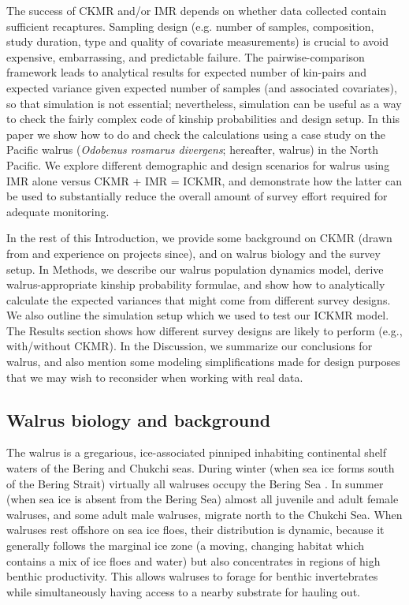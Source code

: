 The success of CKMR and/or IMR depends on whether data collected contain
sufficient recaptures. Sampling design (e.g. number of samples, composition,
study duration, type and quality of covariate measurements) is crucial
to avoid expensive, embarrassing, and predictable failure. The pairwise-comparison
framework leads to analytical results for expected number of kin-pairs
and expected variance given expected number of samples (and associated
covariates), so that simulation is not essential; nevertheless, simulation
can be useful as a way to check the fairly complex code of kinship
probabilities and design setup. In this paper we show how to do and
check the calculations using a case study on the Pacific walrus (\emph{Odobenus
rosmarus divergens}; hereafter, walrus) in the North Pacific. We explore
different demographic and design scenarios for walrus using IMR alone
versus CKMR + IMR = ICKMR, and demonstrate how the latter can be used
to substantially reduce the overall amount of survey effort required
for adequate monitoring.

In the rest of this Introduction, we provide some background on CKMR
(drawn from \citealt{bravington_close-kin_2016} and experience on
projects since), and on walrus biology and the survey setup. In Methods,
we describe our walrus population dynamics model, derive walrus-appropriate
kinship probability formulae, and show how to analytically calculate
the expected variances that might come from different survey designs.
We also outline the simulation setup which we used to test our ICKMR
model. The Results section shows how different survey designs are
likely to perform (e.g., with\slash without CKMR). In the Discussion,
we summarize our conclusions for walrus, and also mention some modeling
simplifications made for design purposes that we may wish to reconsider
when working with real data.

\subsection{Walrus biology and background}

The walrus is a gregarious, ice-associated pinniped inhabiting continental
shelf waters of the Bering and Chukchi seas. During winter (when sea
ice forms south of the Bering Strait) virtually all walruses occupy
the Bering Sea \citep{fay_ecology_1982}. In summer (when sea ice
is absent from the Bering Sea) almost all juvenile and adult female
walruses, and some adult male walruses, migrate north to the Chukchi
Sea. When walruses rest offshore on sea ice floes, their distribution
is dynamic, because it generally follows the marginal ice zone (a
moving, changing habitat which contains a mix of ice floes and water)
but also concentrates in regions of high benthic productivity. This
allows walruses to forage for benthic invertebrates while simultaneously
having access to a nearby substrate for hauling out.

